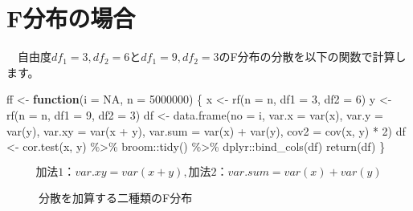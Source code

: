 \documentclass[a4paper]{tufte-handout}
\newenvironment{Shaded}{}{}
\newcommand{\AttributeTok}[1]{\textcolor[rgb]{0.49,0.56,0.16}{#1}}
\newcommand{\ConstantTok}[1]{\textcolor[rgb]{0.53,0.00,0.00}{#1}}
\newcommand{\ControlFlowTok}[1]{\textcolor[rgb]{0.00,0.44,0.13}{\textbf{#1}}}
\newcommand{\DecValTok}[1]{\textcolor[rgb]{0.25,0.63,0.44}{#1}}
\newcommand{\FunctionTok}[1]{\textcolor[rgb]{0.02,0.16,0.49}{#1}}
\newcommand{\NormalTok}[1]{#1}
\newcommand{\OtherTok}[1]{\textcolor[rgb]{0.00,0.44,0.13}{#1}}
\newcommand{\SpecialCharTok}[1]{\textcolor[rgb]{0.25,0.44,0.63}{#1}}
\begin{document}
\newpage

\hypertarget{fux5206ux5e03ux306eux5834ux5408}{%
\section{\texorpdfstring{\textbf{F分布の場合}}{F分布の場合}}\label{fux5206ux5e03ux306eux5834ux5408}}

　自由度\(df_1 = 3, df_2 = 6\)と\(df_1 = 9, df_2 = 3\)のF分布の分散を以下の関数で計算します。

\begin{Shaded}
\begin{Highlighting}[numbers=left,,]
\NormalTok{ff }\OtherTok{\textless{}{-}} \ControlFlowTok{function}\NormalTok{(}\AttributeTok{i =} \ConstantTok{NA}\NormalTok{, }\AttributeTok{n =} \DecValTok{5000000}\NormalTok{) \{}
\NormalTok{  x }\OtherTok{\textless{}{-}} \FunctionTok{rf}\NormalTok{(}\AttributeTok{n =}\NormalTok{ n, }\AttributeTok{df1 =} \DecValTok{3}\NormalTok{, }\AttributeTok{df2 =} \DecValTok{6}\NormalTok{)}
\NormalTok{  y }\OtherTok{\textless{}{-}} \FunctionTok{rf}\NormalTok{(}\AttributeTok{n =}\NormalTok{ n, }\AttributeTok{df1 =} \DecValTok{9}\NormalTok{, }\AttributeTok{df2 =} \DecValTok{3}\NormalTok{)}
\NormalTok{  df }\OtherTok{\textless{}{-}} \FunctionTok{data.frame}\NormalTok{(}\AttributeTok{no =}\NormalTok{ i,}
                   \AttributeTok{var.x =} \FunctionTok{var}\NormalTok{(x), }\AttributeTok{var.y =} \FunctionTok{var}\NormalTok{(y),}
                   \AttributeTok{var.xy =} \FunctionTok{var}\NormalTok{(x }\SpecialCharTok{+}\NormalTok{ y), }\AttributeTok{var.sum =} \FunctionTok{var}\NormalTok{(x) }\SpecialCharTok{+} \FunctionTok{var}\NormalTok{(y),}
                   \AttributeTok{cov2 =} \FunctionTok{cov}\NormalTok{(x, y) }\SpecialCharTok{*} \DecValTok{2}\NormalTok{)}
\NormalTok{  df }\OtherTok{\textless{}{-}} \FunctionTok{cor.test}\NormalTok{(x, y) }\SpecialCharTok{\%\textgreater{}\%}\NormalTok{ broom}\SpecialCharTok{::}\FunctionTok{tidy}\NormalTok{() }\SpecialCharTok{\%\textgreater{}\%}\NormalTok{ dplyr}\SpecialCharTok{::}\FunctionTok{bind\_cols}\NormalTok{(df)}
  \FunctionTok{return}\NormalTok{(df)}
\NormalTok{\}}
\end{Highlighting}
\end{Shaded}

\[\mbox{加法1：}var.xy = var(x + y),　\mbox{加法2：}var.sum = var(x) + var(y)\]

\begin{figure}

{\centering {}

}

\caption[分散を加算する二種類のF分布]{分散を加算する二種類のF分布}\label{fig:unnamed-chunk-11}
\end{figure}
\end{document}
